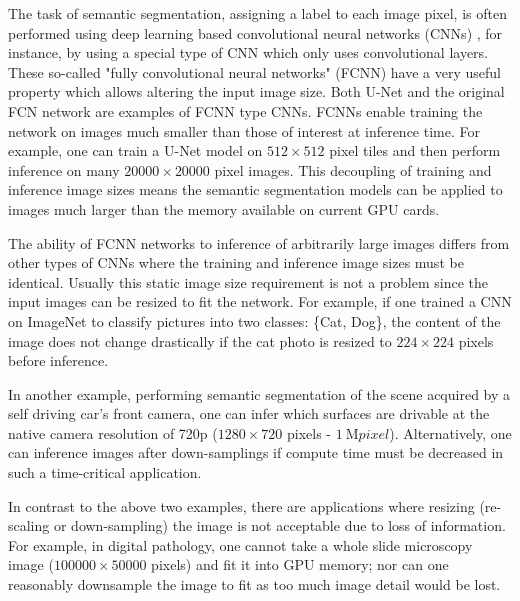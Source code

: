 \documentclass[letterpaper]{article} %
\begin{document}
The task of semantic segmentation, assigning a label to each image pixel, is often performed using deep learning based convolutional neural networks (CNNs) \cite{Badrinarayanan2015a,Ronneberger2015a}, for instance, by using a special type of CNN which only uses convolutional layers.
These so-called "fully convolutional neural networks" (FCNN) have a very useful property which allows altering the input image size. 
Both U-Net \cite{Ronneberger2015a} and the original FCN network \cite{Long2015} are examples of FCNN type CNNs. 
FCNNs enable training the network on images much smaller than those of interest at inference time. 
For example, one can train a U-Net model on $512 \times 512$ pixel tiles and then perform inference on many $\num{20000} \times \num{20000}$ pixel images. This decoupling of training and inference image sizes means the semantic segmentation models can be applied to images much larger than the memory available on current GPU cards. 

The ability of FCNN networks to inference of arbitrarily large images differs from other types of CNNs where the training and inference image sizes must be identical. Usually this static image size requirement is not a problem since the input images can be resized to fit the network. For example, if one trained a CNN on ImageNet \cite{Russakovsky2015} to classify pictures into two classes: \{Cat, Dog\}, the content of the image does not change drastically if the cat photo is resized to $224 \times 224$ pixels before inference.

In another example, performing semantic segmentation of the scene acquired by a self driving car's front camera, one can infer which surfaces are drivable at the native camera resolution of 720p ($1280 \times 720$ pixels - $\SI{1}{\mega pixel}$). Alternatively, one can inference images after down-samplings if compute time must be decreased in such a time-critical application. 

In contrast to the above two examples, there are applications where resizing (re-scaling or down-sampling) the image is not acceptable due to loss of information. For example, in digital pathology, one cannot take a whole slide microscopy image ($\num{100000} \times \num{50000}$ pixels) and fit it into GPU memory; nor can one reasonably downsample the image to fit as too much image detail would be lost. 
\end{document}
